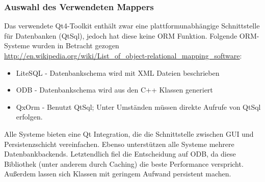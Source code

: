 \subsubsection{Auswahl des Verwendeten Mappers}
Das verwendete Qt4-Toolkit enthält zwar eine plattformunabhängige Schnittstelle für Datenbanken (QtSql), jedoch hat diese keine ORM Funktion.
Folgende ORM-Systeme wurden in Betracht gezogen\\
\url{http://en.wikipedia.org/wiki/List_of_object-relational_mapping_software}:
\begin{itemize}
	\item LiteSQL - Datenbankschema wird mit XML Dateien beschrieben
	\item ODB - Datenbankschema wird aus den C++ Klassen generiert
	\item QxOrm - Benutzt QtSql; Unter Umständen müssen direkte Aufrufe von QtSql erfolgen. \cite{QxOrm_Tutorial}
\end{itemize}
Alle Systeme bieten eine Qt Integration, die die Schnittstelle zwischen GUI und Persistenzschicht vereinfachen.
Ebenso unterstützen alle Systeme mehrere Datenbankbackends.
Letztendlich fiel die Entscheidung auf ODB, da diese Bibliothek (unter anderem durch Caching) die beste Performance verspricht.
Außerdem lassen sich Klassen mit geringem Aufwand persistent machen.

\newpage

